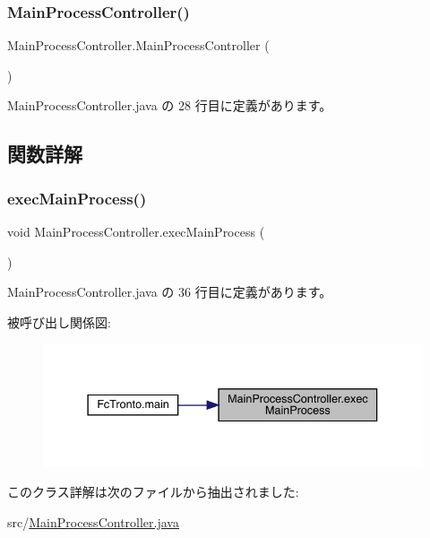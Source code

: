\subsubsection{\texorpdfstring{MainProcessController()}{MainProcessController()}}
{\footnotesize\ttfamily Main\+Process\+Controller.\+Main\+Process\+Controller (\begin{DoxyParamCaption}{ }\end{DoxyParamCaption})\hspace{0.3cm}{\ttfamily [inline]}}



 Main\+Process\+Controller.\+java の 28 行目に定義があります。



\subsection{関数詳解}
\mbox{\label{class_main_process_controller_ac92bd6b23aa4c17913d6a9c63ee72739}} 
\subsubsection{\texorpdfstring{execMainProcess()}{execMainProcess()}}
{\footnotesize\ttfamily void Main\+Process\+Controller.\+exec\+Main\+Process (\begin{DoxyParamCaption}{ }\end{DoxyParamCaption})\hspace{0.3cm}{\ttfamily [inline]}}



 Main\+Process\+Controller.\+java の 36 行目に定義があります。

被呼び出し関係図\+:
\nopagebreak
\begin{figure}[H]
\begin{center}
\leavevmode
\includegraphics[width=337pt]{d2/d71/class_main_process_controller_ac92bd6b23aa4c17913d6a9c63ee72739_icgraph}
\end{center}
\end{figure}


このクラス詳解は次のファイルから抽出されました\+:\begin{DoxyCompactItemize}
\item 
src/\mbox{\hyperlink{_main_process_controller_8java}{Main\+Process\+Controller.\+java}}\end{DoxyCompactItemize}
